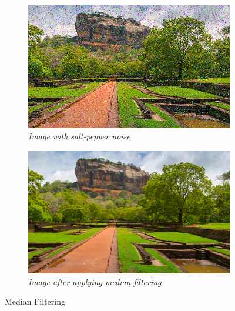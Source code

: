 \documentclass[11pt, a4paper]{article}
\begin{document}
\begin{center}
\begin{minipage}{0.8\textwidth}
\begin{figure}[H]
	\centering
	\begin{subfigure}[b]{0.45\textwidth}
		\centering
		\includegraphics[width=\textwidth]{./Outputs/Salt_Image.png}
		\caption{{\small \textit{Image with salt-pepper noise}}}
		\label{fig:Salt image}
	\end{subfigure}
	\hfill
	\begin{subfigure}[b]{0.45\textwidth}
		\centering
		\includegraphics[width=\textwidth]{./Outputs/Median_filt_Image.png}
		\caption{{\small \textit{Image after applying median filtering}}}
		\label{fig:Median Image}
	\end{subfigure}
	\caption{Median Filtering}
\end{figure}
\end{minipage}
\end{center}
\end{document}
